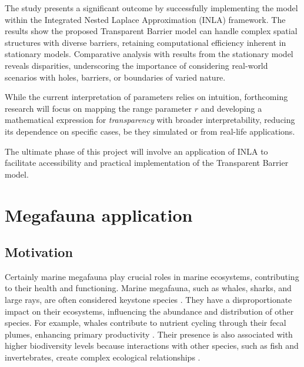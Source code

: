 \documentclass[
]{book}
\begin{document}
The study presents a significant outcome by successfully implementing the model within the Integrated Nested Laplace Approximation (INLA) framework. The results show the proposed Transparent Barrier model can handle complex spatial structures with diverse barriers, retaining computational efficiency inherent in stationary models. Comparative analysis with results from the stationary model reveals disparities, underscoring the importance of considering real-world scenarios with holes, barriers, or boundaries of varied nature.

While the current interpretation of parameters relies on intuition, forthcoming research will focus on mapping the range parameter \(r\) and developing a mathematical expression for \emph{transparency} with broader interpretability, reducing its dependence on specific cases, be they simulated or from real-life applications.

The ultimate phase of this project will involve an application of INLA to facilitate accessibility and practical implementation of the Transparent Barrier model.

\hypertarget{megafauna-application}{%
\chapter{Megafauna application}\label{megafauna-application}}

\hypertarget{motivation-1}{%
\section{Motivation}\label{motivation-1}}

Certainly marine megafauna play crucial roles in marine ecosystems, contributing to their health and functioning.
Marine megafauna, such as whales, sharks, and large rays, are often considered keystone species \citep{hooper_effects_2005}. They have a disproportionate impact on their ecosystems, influencing the abundance and distribution of other species. For example, whales contribute to nutrient cycling through their fecal plumes, enhancing primary productivity \citep{estes_trophic_2011}. Their presence is also associated with higher biodiversity levels because interactions with other species, such as fish and invertebrates, create complex ecological relationships \citep{beger_conservation_2010, block_tracking_2011, heithaus_predicting_2008, orams_marine_2002}.
\end{document}
